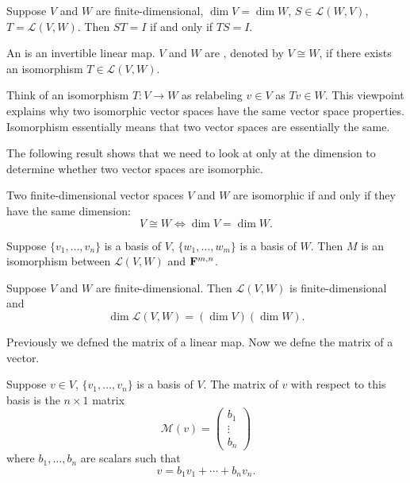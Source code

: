 \begin{corollary}
Suppose $V$ and $W$ are finite-dimensional, $\dim V=\dim W$, $S\in\mathcal{L}(W,V)$, $T=\mathcal{L}(V,W)$. Then $ST=I$ if and only if $TS=I$.
\end{corollary}

\begin{definition}[Isomorphism]
An  is an invertible linear map. $V$ and $W$ are , denoted by $V\cong W$, if there exists an isomorphism $T\in\mathcal{L}(V,W)$.
\end{definition}

\begin{remark}
Think of an isomorphism $T:V\to W$ as relabeling $v\in V$ as $Tv\in W$. This viewpoint explains why two isomorphic vector spaces have the same vector space properties. Isomorphism essentially means that two vector spaces are essentially the same.
\end{remark}

The following result shows that we need to look at only at the dimension to determine whether two vector spaces are isomorphic.

\begin{lemma}
Two finite-dimensional vector spaces $V$ and $W$ are isomorphic if and only if they have the same dimension:
\[V\cong W\iff\dim V=\dim W.\]
\end{lemma}

\begin{proposition}
Suppose $\{v_1,\dots,v_n\}$ is a basis of $V$, $\{w_1,\dots,w_m\}$ is a basis of $W$. Then $M$ is an isomorphism between $\mathcal{L}(V,W)$ and $\mathbf F^{m,n}$.
\end{proposition}

\begin{corollary}\label{cor:dimension-product}
Suppose $V$ and $W$ are finite-dimensional. Then $\mathcal{L}(V,W)$ is finite-dimensional and
\[\dim\mathcal{L}(V,W)=(\dim V)(\dim W).\]
\end{corollary}

Previously we defned the matrix of a linear map. Now we defne the matrix of a vector.

\begin{definition}
Suppose $v\in V$, $\{v_1,\dots,v_n\}$ is a basis of $V$. The matrix of $v$ with respect to this basis is the $n\times1$ matrix
\[\mathcal{M}(v)=\begin{pmatrix}
b_1\\\vdots\\b_n
\end{pmatrix}\]
where $b_1,\dots,b_n$ are scalars such that
\[v=b_1v_1+\cdots+b_nv_n.\]
\end{definition}

